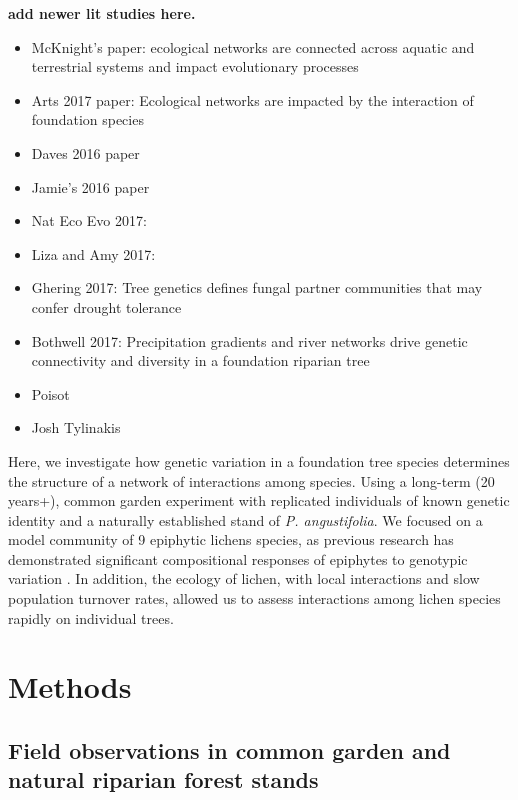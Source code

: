 \documentclass[fleqn,10pt]{wlscirep}
\begin{document}
\textbf{add newer lit studies here.}
\begin{itemize}
\item McKnight's paper: ecological networks are connected across
  aquatic and terrestrial systems and impact evolutionary processes
\item Arts 2017 paper: Ecological networks are impacted by the
  interaction of foundation species
\item Daves 2016 paper
\item Jamie's 2016 paper
\item Nat Eco Evo 2017:
\item Liza and Amy 2017: 
\item Ghering 2017: Tree genetics defines fungal partner communities
  that may confer drought tolerance
\item Bothwell 2017: Precipitation gradients and river networks drive
  genetic connectivity and diversity in a foundation riparian tree
\item Poisot
\item Josh Tylinakis
\end{itemize}



Here, we investigate how genetic variation in a foundation tree
species determines the structure of a network of interactions among
species. Using a long-term (20 years+), common garden experiment with
replicated individuals of known genetic identity and a naturally
established stand of \textit{P. angustifolia}. We focused on a model
community of 9 epiphytic lichens species, as previous research has
demonstrated significant compositional responses of epiphytes to
genotypic variation \cite{Winfree2011, Zytynska2011}. In addition, the
ecology of lichen, with local interactions and slow population
turnover rates, allowed us to assess interactions among lichen species
rapidly on individual trees.


\section*{Methods}


\subsection*{Field observations in common garden and natural riparian
  forest stands}
\end{document}
